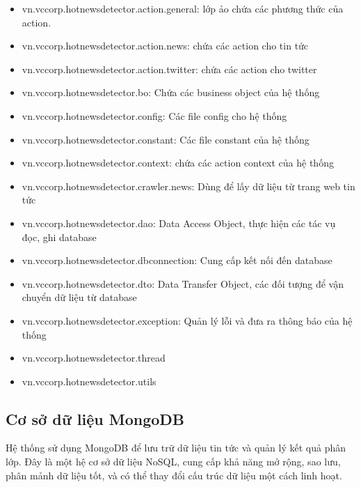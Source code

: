 	\begin{itemize}
		\item vn.vccorp.hotnewsdetector.action.general: lớp ảo chứa các phương thức của action.
		\item vn.vccorp.hotnewsdetector.action.news: chứa các action cho tin tức
		\item vn.vccorp.hotnewsdetector.action.twitter: chứa các action cho twitter
		\item vn.vccorp.hotnewsdetector.bo: Chứa các business object của hệ thống
		\item vn.vccorp.hotnewsdetector.config: Các file config cho hệ thống
		\item vn.vccorp.hotnewsdetector.constant: Các file constant của hệ thống
		\item vn.vccorp.hotnewsdetector.context: chứa các action context của hệ thống
		\item vn.vccorp.hotnewsdetector.crawler.news: Dùng để lấy dữ liệu từ trang web tin tức
		\item vn.vccorp.hotnewsdetector.dao: Data Access Object, thực hiện các tác vụ đọc, ghi database
		\item vn.vccorp.hotnewsdetector.dbconnection: Cung cấp kết nối đến database
		\item vn.vccorp.hotnewsdetector.dto: Data Transfer Object, các đối tượng để vận chuyển dữ liệu từ database
		\item vn.vccorp.hotnewsdetector.exception: Quản lý lỗi và đưa ra thông báo của hệ thống
		\item vn.vccorp.hotnewsdetector.thread
		\item vn.vccorp.hotnewsdetector.utils
	\end{itemize}
	
	\subsection{Cơ sở dữ liệu MongoDB}
	Hệ thống sử dụng MongoDB để lưu trữ dữ liệu tin tức và quản lý kết quả phân lớp. Đây là một hệ cơ sở dữ liệu NoSQL, cung cấp khả năng mở rộng, sao lưu, phân mảnh dữ liệu tốt, và có thể thay đổi cấu trúc dữ liệu một cách linh hoạt.
	
